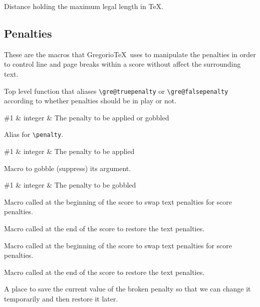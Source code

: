 Distance holding the maximum legal length in TeX.


\subsection{Penalties}
These are the macros that Gregorio\TeX\ uses to manipulate the penalties in order to control line and page breaks within a score without affect the surrounding text.

Top level function that aliases \verb=\gre@truepenalty= or \verb=\gre@falsepenalty= according to whether penalties should be in play or not.

\begin{argtable}
  \#1 & integer & The penalty to be applied or gobbled\\
\end{argtable}

Alias for \verb=\penalty=.

\begin{argtable}
  \#1 & integer & The penalty to be applied\\
\end{argtable}

Macro to gobble (suppress) its argument.

\begin{argtable}
  \#1 & integer & The penalty to be gobbled\\
\end{argtable}

Macro called at the beginning of the score to swap text penalties for score penalties.

Macro called at the end of the score to restore the text penalties.

Macro called at the beginning of the score to swap text penalties for score penalties.

Macro called at the end of the score to restore the text penalties.

A place to save the current value of the broken penalty so that we can change it temporarily and then restore it later.

